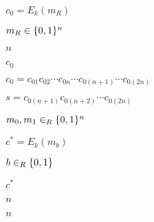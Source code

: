 \documentclass[10pt]{book}
\begin{document}
\begin{mdSnippets}
\begin{mdInlineSnippet}[791f6228f9fd6806cc9594063b82de48]%
$c_0 = E_k(m_R)$\end{mdInlineSnippet}%
\begin{mdInlineSnippet}[c75a8ea4a8c0ccbb0e9a439b6e3e2d36]%
$m_R \in \{0,1\}^n$\end{mdInlineSnippet}%
\begin{mdInlineSnippet}[7b8b965ad4bca0e41ab51de7b31363a1]%
$n$\end{mdInlineSnippet}%
\begin{mdInlineSnippet}[179474ed9fdcb4ad56770fe1228e1a75]%
$c_0$\end{mdInlineSnippet}%
\begin{mdInlineSnippet}%
$c_0 = c_{01}c_{02} \cdots c_{0n} \cdots c_{0(n+1)}\cdots c_{0(2n)}$\end{mdInlineSnippet}%
\begin{mdInlineSnippet}[ae3c1607858a4a5a76956dcddd10f1de]%
$s = c_{0(n+1)}c_{0(n+2)} \cdots c_{0(2n)}$\end{mdInlineSnippet}%
\begin{mdInlineSnippet}[2a76336d4c199241986d1ff112bf637a]%
$m_0, m_1 \in_R \{0,1\}^n$\end{mdInlineSnippet}%
\begin{mdInlineSnippet}[ef31559dcdbd83704fc209021ae2b032]%
$c^* = E_k(m_b)$\end{mdInlineSnippet}%
\begin{mdInlineSnippet}%
$b \in_R \{0,1\}$\end{mdInlineSnippet}%
\begin{mdInlineSnippet}%
$c^*$\end{mdInlineSnippet}%
\begin{mdInlineSnippet}[7b8b965ad4bca0e41ab51de7b31363a1]%
$n$\end{mdInlineSnippet}%
\begin{mdInlineSnippet}[7b8b965ad4bca0e41ab51de7b31363a1]%
$n$\end{mdInlineSnippet}%
\begin{mdInlineSnippet}[179474ed9fdcb4ad56770fe1228e1a75]%

\end{mdInlineSnippet}
\end{mdSnippets}
\end{document}
